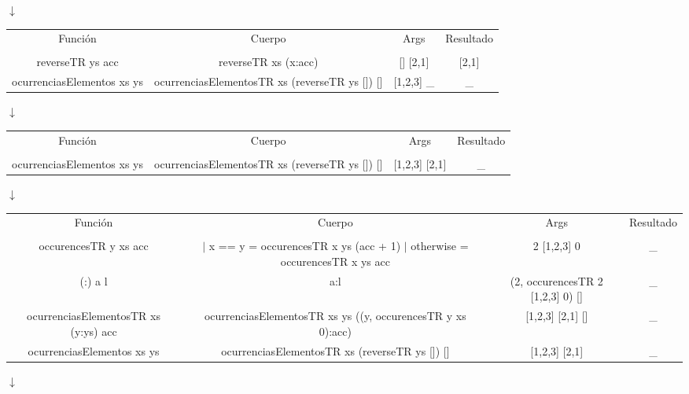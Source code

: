 \begin{enumerate}
{\begin{itemize}
{\begin{center}
                $\downarrow$
                
                \begin{NiceTabular}{|c c c c|}
                    Función & Cuerpo & Args & Resultado \\
                    &&&\\
                    reverseTR ys acc & reverseTR xs (x:acc) & [] [2,1] & [2,1]\\ \hline 
                    ocurrenciasElementos xs ys & ocurrenciasElementosTR xs (reverseTR ys []) [] & [1,2,3] \_ & \_ \\ \hline
                \end{NiceTabular}

                $\downarrow$
                
                \begin{NiceTabular}{|c c c c|}
                    Función & Cuerpo & Args & Resultado \\
                    &&&\\
                    ocurrenciasElementos xs ys & ocurrenciasElementosTR xs (reverseTR ys []) [] & [1,2,3] [2,1] & \_ \\ \hline
                \end{NiceTabular}

                $\downarrow$
                
                \begin{NiceTabular}{|c c c c|}
                    Función & Cuerpo & Args & Resultado \\
                    &&&\\
                    occurencesTR y xs acc & $|$ x == y = occurencesTR x ys (acc + 1) $|$ otherwise = occurencesTR x ys acc & 2 [1,2,3] 0 & \_ \\ \hline
                    (:) a l & a:l & (2, occurencesTR 2 [1,2,3] 0) [] & \_ \\ \hline
                    ocurrenciasElementosTR xs (y:ys) acc & ocurrenciasElementosTR xs ys ((y, occurencesTR y xs 0):acc) & [1,2,3] [2,1] [] & \_ \\ \hline
                    ocurrenciasElementos xs ys & ocurrenciasElementosTR xs (reverseTR ys []) [] & [1,2,3] [2,1] & \_ \\ \hline
                \end{NiceTabular}

                $\downarrow$
                

\end{center}}
\end{itemize}}
\end{enumerate}

